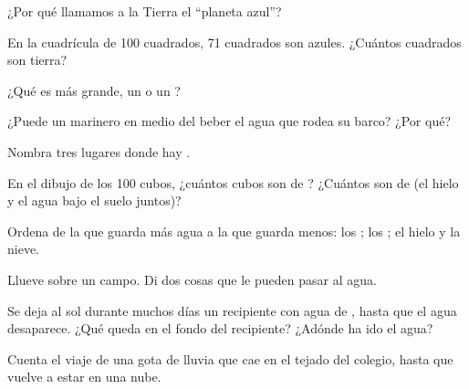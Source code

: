 \begin{exercise}[$\star$]\label{exo:g2:water-on-earth:2}
¿Por qué llamamos a la Tierra el ``planeta azul''?
\end{exercise}

\begin{exercise}[$\star$]\label{exo:g2:water-on-earth:3}
En la cuadrícula de 100 cuadrados, 71 cuadrados son azules. ¿Cuántos
cuadrados son tierra?
\end{exercise}

\begin{exercise}[$\star$]\label{exo:g2:water-on-earth:4}
¿Qué es más grande, un  o un ?
\end{exercise}

\begin{exercise}[$\star$]\label{exo:g2:water-on-earth:5}
¿Puede un marinero en medio del  beber el agua que rodea su barco?
¿Por qué?
\end{exercise}

\begin{exercise}[$\star$]\label{exo:g2:water-on-earth:6}
Nombra tres lugares donde hay .
\end{exercise}

\begin{exercise}[$\star\star$]\label{exo:g2:water-on-earth:7}
En el dibujo de los 100 cubos, ¿cuántos cubos son de ? ¿Cuántos
son de  (el hielo y el agua bajo el suelo juntos)?
\end{exercise}

\begin{exercise}[$\star\star$]\label{exo:g2:water-on-earth:8}
Ordena de la que guarda más agua a la que guarda menos: los ; los
; el hielo y la nieve.
\end{exercise}

\begin{exercise}[$\star\star$]\label{exo:g2:water-on-earth:9}
Llueve sobre un campo. Di dos cosas que le pueden pasar al agua.
\end{exercise}

\begin{exercise}[$\star\star$]\label{exo:g2:water-on-earth:10}
Se deja al sol durante muchos días un recipiente con agua de , hasta que
el agua desaparece. ¿Qué queda en el fondo del recipiente? ¿Adónde ha ido el
agua?
\end{exercise}

\begin{exercise}[$\star\star$]\label{exo:g2:water-on-earth:11}
Cuenta el viaje de una gota de lluvia que cae en el tejado del colegio,
hasta que vuelve a estar en una nube.
\end{exercise}

